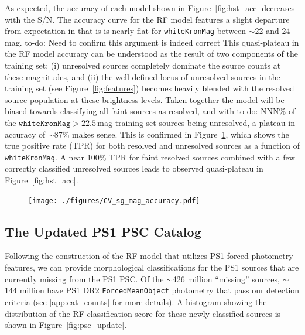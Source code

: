 \documentclass[twocolumn]{aastex63}
\newcommand{\todo}[1]{{\color{magenta} to-do: {#1}}}
\begin{document}
As expected, the accuracy of each model shown in Figure~\ref{fig:hst_acc}
decreases with the S/N. The accuracy curve for the RF model features a slight
departure from expectation in that is is nearly flat for \texttt{whiteKronMag}
between $\sim$22 and 24\,mag. \todo{Need to confirm this argument is indeed
correct} This quasi-plateau in the RF model accuracy can be understood as the
result of two components of the training set: (i) unresolved sources
completely dominate the source counts at these magnitudes, and (ii) the
well-defined locus of unresolved sources in the training set (see
Figure~\ref{fig:features}) becomes heavily blended with the resolved source
population at these brightness levels. Taken together the model will be biased
towards classifying all faint sources as resolved, and with \todo{NNN}\% of
the $\mathtt{whiteKronMag} > 22.5$\,mag training set sources being unresolved,
a plateau in accuracy of $\sim$87\% makes sense. This is confirmed in
Figure~\ref{fig:sg_accuracy}, which shows the true positive rate (TPR) for
both resolved and unresolved sources as a function of \texttt{whiteKronMag}. A
near 100\% TPR for faint resolved sources combined with a few correctly
classified unresolved sources leads to observed quasi-plateau in
Figure~\ref{fig:hst_acc}.

\begin{figure}
    \centering
    \texttt{[image: ./figures/CV\_sg\_mag\_accuracy.pdf]}
    \caption{}
    \label{fig:sg_accuracy}
\end{figure}    

\subsection{The Updated PS1 PSC Catalog}\label{sec:ps1psc_update}

Following the construction of the RF model that utilizes PS1 forced photometry
features, we can provide morphological classifications for the PS1 sources
that are currently missing from the PS1 PSC. Of the $\sim$426 million
``missing'' sources, $\sim$144 million have PS1 DR2 \texttt{ForcedMeanObject}
photometry that pass our detection criteria (see \ref{app:cat_counts} for more
details). A histogram showing the distribution of the RF classification score
for these newly classified sources is shown in Figure~\ref{fig:psc_update}.
\end{document}
